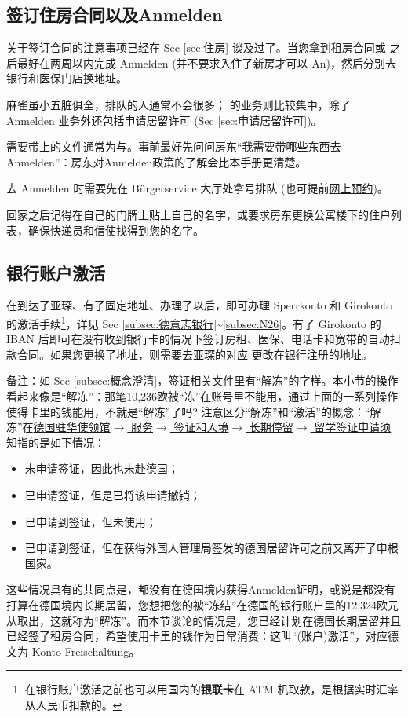   \subsection{签订住房合同以及Anmelden}\label{subsec:签订住房合同以及Anmelden}

    关于签订合同的注意事项已经在 Sec \ref{sec:住房} 谈及过了。当您拿到租房合同或 之后最好在两周以内完成 Anmelden (并不要求入住了新房才可以 An)，然后分别去银行和医保门店换地址。

     麻雀虽小五脏俱全，排队的人通常不会很多； 的业务则比较集中，除了 Anmelden 业务外还包括申请居留许可 (Sec \ref{sec:申请居留许可})。

    需要带上的文件通常为与。事前最好先问问房东``我需要带哪些东西去Anmelden''：房东对Anmelden政策的了解会比本手册更清楚。

    去 Anmelden 时需要先在 Bürgerservice 大厅处拿号排队 (也可提前\href{https://www.qtermin.de/bahnhofplatzkatschhof}{网上预约})。

    回家之后记得在自己的门牌上贴上自己的名字，或要求房东更换公寓楼下的住户列表，确保快递员和信使找得到您的名字。

  \subsection{银行账户激活}\label{subsec:银行账户激活}

    在到达了亚琛、有了固定地址、办理了以后，即可办理 Sperrkonto 和 Girokonto 的激活手续\footnote{在银行账户激活之前也可以用国内的\textbf{银联卡}在 ATM 机取款，是根据实时汇率从人民币扣款的。}，详见 Sec \ref{subsec:德意志银行}\textasciitilde\ref{subsec:N26}。有了 Girokonto 的 IBAN 后即可在没有收到银行卡的情况下签订房租、医保、电话卡和宽带的自动扣款合同。如果您更换了地址，则需要去亚琛的对应 更改在银行注册的地址。

    备注：如 Sec \ref{subsec:概念澄清}，签证相关文件里有``解冻''的字样。本小节的操作看起来像是``解冻''：那笔10,236欧被``冻''在账号里不能用，通过上面的一系列操作使得卡里的钱能用，不就是``解冻''了吗? 注意区分``解冻''和``激活''的概念：``解冻''在\href{https://china.diplo.de/blob/1341652/c79bd5edf0554386e9c4285bd447c2fc/pdf-merkblatt-natvisum-studium-data.pdf}{德国驻华使领馆$\rightarrow$ 服务$\rightarrow$ 签证和入境$\rightarrow$ 长期停留$\rightarrow$ 留学签证申请须知}指的是如下情况：
    \begin{itemize}
      \item 未申请签证，因此也未赴德国；
      \item 已申请签证，但是已将该申请撤销；
      \item 已申请到签证，但未使用；
      \item 已申请到签证，但在获得外国人管理局签发的德国居留许可之前又离开了申根国家。
    \end{itemize}
    这些情况具有的共同点是，都没有在德国境内获得Anmelden证明，或说是都没有打算在德国境内长期居留，您想把您的被``冻结''在德国的银行账户里的12,324欧元从取出，这就称为``解冻''。而本节谈论的情况是，您已经计划在德国长期居留并且已经签了租房合同，希望使用卡里的钱作为日常消费：这叫``(账户)激活''，对应德文为 Konto Freischaltung。

